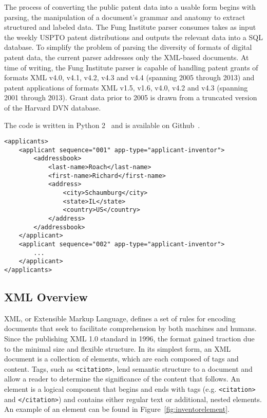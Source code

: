 The process of converting the public patent data into a usable form begins with parsing, the manipulation of a document's grammar and anatomy to extract structured and labeled data. The Fung Institute parser consumes takes as input the weekly USPTO patent distributions and outputs the relevant data into a SQL database. To simplify the problem of parsing the diversity of formats of digital patent data, the current parser addresses only the XML-based documents. At time of writing, the Fung Institute parser is capable of handling patent grants of formats XML v4.0, v4.1, v4.2, v4.3 and v4.4 (spanning 2005 through 2013) and patent applications of formats XML v1.5, v1.6, v4.0, v4.2 and v4.3 (spanning 2001 through 2013). Grant data prior to 2005 is drawn from a truncated version of the Harvard DVN database.

The code is written in Python 2~\cite{python} and is available on Github~\cite{newparser}.

\begin{figure*}[t]
\center
\begin{verbatim}
<applicants>
    <applicant sequence="001" app-type="applicant-inventor">
        <addressbook>
            <last-name>Roach</last-name>
            <first-name>Richard</first-name>
            <address>
                <city>Schaumburg</city>
                <state>IL</state>
                <country>US</country>
            </address>
        </addressbook>
    </applicant>
    <applicant sequence="002" app-type="applicant-inventor">
        ...
    </applicant>
</applicants>
\end{verbatim}
\caption{Sample inventor element from XML v4.2 schema}
\label{fig:inventorelement}
\end{figure*}

\subsection{XML Overview}

XML, or Extensible Markup Language, defines a set of rules for encoding documents that seek to facilitate comprehension by both machines and humans. Since the publishing XML 1.0 standard in 1996, the format gained traction due to the minimal size and flexible structure. In its simplest form, an XML document is a collection of elements, which are each composed of tags and content. Tags, such as \verb`<citation>`, lend semantic structure to a document and allow a reader to determine the significance of the content that follows. An element is a logical component that begins and ends with tags (e.g. \verb`<citation>` and \verb`</citation>`)
and contains either regular text or additional, nested elements. An example of an element can be found in Figure~\ref{fig:inventorelement}.

